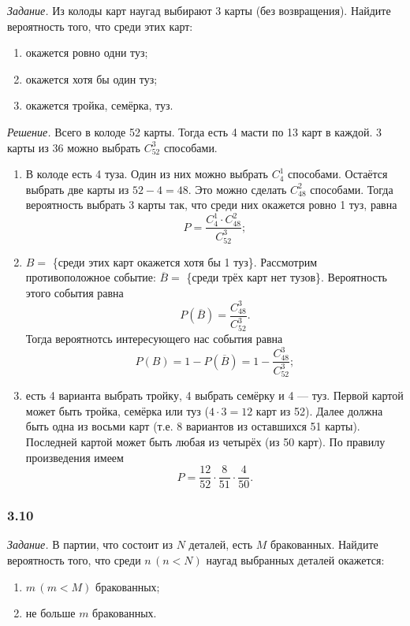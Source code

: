 \textit{Задание.} Из колоды карт наугад выбирают 3 карты (без возвращения).
Найдите вероятность того, что среди этих карт:
\begin{enumerate}[label=\alph*)]
\item окажется ровно одни туз;
\item окажется хотя бы один туз;
\item окажется тройка, семёрка, туз.
\end{enumerate}

\textit{Решение.} Всего в колоде 52 карты.
Тогда есть 4 масти по 13 карт в каждой.
3 карты из 36 можно выбрать $C_{52}^3$ способами.

\begin{enumerate}[label=\alph*)]
\item В колоде есть 4 туза.
Один из них можно выбрать $C_4^1$ способами.
Остаётся выбрать две карты из $52-4=48$.
Это можно сделать $C_{48}^2$ способами.
Тогда вероятность выбрать 3 карты так, что среди них окажется ровно 1 туз, равна
$$P =
\frac{C_4^1 \cdot C_{48}^2}{C_{52}^3};$$

\item $B =$ \{среди этих карт окажется хотя бы 1 туз\}.
Рассмотрим противоположное событие: $ \overline{B} =$ \{среди трёх карт нет тузов\}.
Вероятность этого события равна
$$P \left( \overline{B} \right) =
\frac{C_{48}^3}{C_{52}^3}.$$
Тогда вероятнотсь интересующего нас события равна
$$P \left( B \right) =
1 - P \left( \overline{B} \right) =
1 - \frac{C_{48}^3}{C_{52}^3};$$

\item есть 4 варианта выбрать тройку, 4 выбрать семёрку и 4 --- туз.
Первой картой может быть тройка, семёрка или туз ($4 \cdot 3 = 12$ карт из 52).
Далее должна быть одна из восьми карт (т.е. 8 вариантов из оставшихся 51 карты).
Последней картой может быть любая из четырёх (из 50 карт).
По правилу произведения имеем
$$P =
\frac{12}{52} \cdot \frac{8}{51} \cdot \frac{4}{50}.$$
\end{enumerate}

\subsubsection*{3.10}

\textit{Задание.} В партии, что состоит из $N$ деталей, есть $M$ бракованных.
Найдите вероятность того, что среди $n \, \left( n < N \right)$ наугад выбранных деталей окажется:
\begin{enumerate}[label=\alph*)]
\item $m \, \left( m < M \right) $ бракованных;
\item не больше $m$ бракованных.
\end{enumerate}

